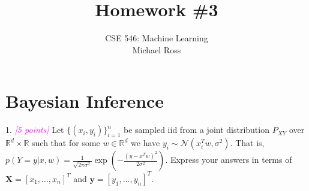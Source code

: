 \documentclass{article}
\date{{}}
\newcommand{\field}[1]{\mathbb{#1}}
\newcommand{\mb}[1]{\mathbf{#1}}
\newcommand{\1}{\mathbf{1}}
\newcommand{\R}{\field{R}} %
\newcommand{\grade}[1]{\small\textcolor{magenta}{\emph{[#1 points]}} \normalsize}
\begin{document}
\title{Homework \#3}
\author{\normalsize{CSE 546: Machine Learning}\\
\normalsize{Michael Ross}}
\maketitle


\section{Bayesian Inference}

1. \grade{5} Let $\{(x_i,y_i)\}_{i=1}^n$ be sampled iid from a joint distribution $P_{XY}$ over $\R^d \times \R$ such that for some $w \in \R^d$ we have $y_i \sim \mathcal{N}(x_i^T w,\sigma^2)$. That is, $p(Y =y | x, w) = \frac{1}{\sqrt{2\pi\sigma^2}} \exp(-\frac{(y-x^T w)^2}{2\sigma^2})$. Express your answers in terms of $\mb{X} = [x_1,\dots,x_n]^T$ and $\mb{y} = [y_1,\dots,y_n]^T$.
\end{document}
